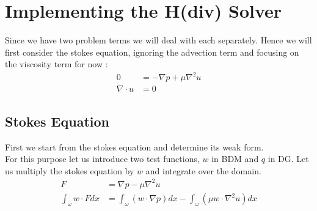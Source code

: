 \documentclass[11pt,twoside,a4paper]{article}
\begin{document}
\section{Implementing the H(div) Solver}
Since we have two problem terms we will deal with each separately. Hence we will first consider the stokes equation, ignoring the advection term and focusing on the viscosity term for now :
\begin{align}
0 &= -\nabla p + \mu \nabla^2 u  \\
\nabla \cdot u &= 0
\end{align}

\subsection{Stokes Equation}
First we start from the stokes equation and determine its weak form.\\
For this purpose let us introduce two test functions, $w$ in BDM and $q$ in DG.
Let us multiply the stokes equation by $w$ and integrate over the domain.
\begin{align*}
F &= \nabla p - \mu \nabla^2 u \\
\int_\omega w \cdot F dx &= \int_\omega (w \cdot \nabla p) dx - \int_\omega (\mu w \cdot \nabla^2 u) dx
\end{align*}
\end{document}
